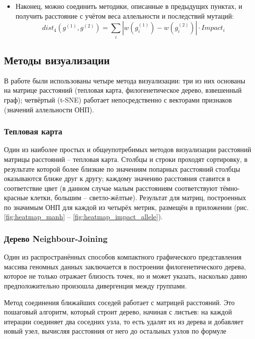 \documentclass[main.tex]{subfiles}
\begin{document}
\begin{itemize}
    \item Наконец, можно соединить методики, описанные в предыдущих пунктах, и получить расстояние с учётом веса аллельности и последствий мутаций:
    \begin{equation}\label{eq:impact_allele}
        dist_4(g^{(1)}, g^{(2)}) = \sum_{i} | w(g^{(1)}_i) - w(g^{(2)}_i) | \cdot Impact_i
    \end{equation}


\end{itemize}

\subsection{Методы визуализации}\label{section:viz}

В работе были использованы четыре метода визуализации: три из них основаны на матрице расстояний (тепловая карта, филогенетическое дерево, взвешенный граф); четвёртый (t-SNE) работает непосредственно с векторами признаков (значений аллельности ОНП).

\subsubsection{Тепловая карта}

Один из наиболее простых и общеупотребимых методов визуализации расстояний матрицы расстояний -- тепловая карта. Столбцы и строки проходят сортировку, в результате которой более близкие по значениям попарных расстояний столбцы оказываются ближе друг к другу; каждому значению расстояния ставится в соответствие цвет (в данном случае малым расстояниям соответствуют тёмно-красные клетки, большим -- светло-жёлтые). Результат для матриц, построенных по значимым ОНП для каждой из четырёх метрик, размещён в приложении (рис. \ref{fig:heatmap_manh} -- \ref{fig:heatmap_impact_allele}).


\subsubsection{Дерево Neighbour-Joining}

Один из распространённых способов компактного графического представления массива геномных данных заключается в построении филогенетического дерева, которое не только отражает близость точек, но и может указать, насколько давно предположительно произошла дивергенция между группами.

Метод соединения ближайших соседей работает с матрицей расстояний. Это пошаговый алгоритм, который строит дерево, начиная с листьев: на каждой итерации соединяет два соседних узла, то есть удалят их из дерева и добавляет новый узел, вычисляя расстояния от него до остальных узлов по формуле
\end{document}
